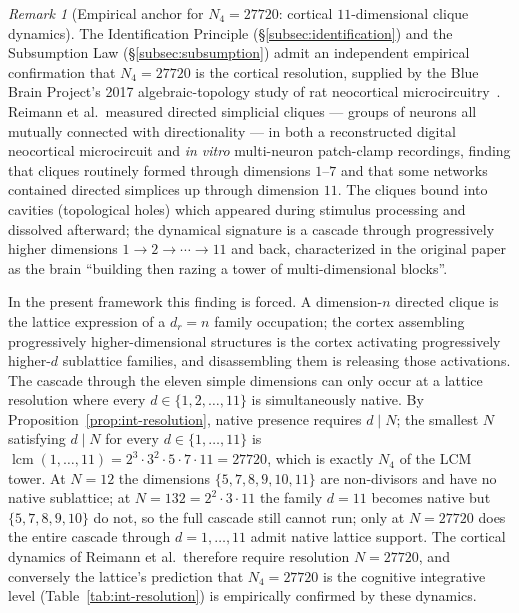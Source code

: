 \documentclass[11pt,a4paper]{article}
\theoremstyle{definition}
\theoremstyle{remark}
\newtheorem{remark}[theorem]{Remark}
\DeclareMathOperator{\lcm}{lcm}
\begin{document}
\begin{remark}[Empirical anchor for $N_{4}=27720$: cortical $11$-dimensional clique dynamics]\label{rem:cortex-27720}
The Identification Principle (\S\ref{subsec:identification}) and the Subsumption Law (\S\ref{subsec:subsumption}) admit an independent empirical confirmation that $N_{4}=27720$ is the cortical resolution, supplied by the Blue Brain Project's 2017 algebraic-topology study of rat neocortical microcircuitry~\cite{BlueBrain2017}. Reimann et al.\ measured directed simplicial cliques --- groups of neurons all mutually connected with directionality --- in both a reconstructed digital neocortical microcircuit and \emph{in vitro} multi-neuron patch-clamp recordings, finding that cliques routinely formed through dimensions $1$--$7$ and that some networks contained directed simplices up through dimension $11$. The cliques bound into cavities (topological holes) which appeared during stimulus processing and dissolved afterward; the dynamical signature is a cascade through progressively higher dimensions $1 \to 2 \to \cdots \to 11$ and back, characterized in the original paper as the brain ``building then razing a tower of multi-dimensional blocks''.

In the present framework this finding is forced. A dimension-$n$ directed clique is the lattice expression of a $d_{r}=n$ family occupation; the cortex assembling progressively higher-dimensional structures is the cortex activating progressively higher-$d$ sublattice families, and disassembling them is releasing those activations. The cascade through the eleven simple dimensions can only occur at a lattice resolution where every $d \in \{1,2,\ldots,11\}$ is simultaneously native. By Proposition~\ref{prop:int-resolution}, native presence requires $d \mid N$; the smallest $N$ satisfying $d \mid N$ for every $d \in \{1,\ldots,11\}$ is $\lcm(1,\ldots,11) = 2^{3}\cdot 3^{2}\cdot 5\cdot 7\cdot 11 = 27720$, which is exactly $N_{4}$ of the LCM tower. At $N=12$ the dimensions $\{5,7,8,9,10,11\}$ are non-divisors and have no native sublattice; at $N=132 = 2^{2}\cdot 3\cdot 11$ the family $d=11$ becomes native but $\{5,7,8,9,10\}$ do not, so the full cascade still cannot run; only at $N=27720$ does the entire cascade through $d=1,\ldots,11$ admit native lattice support. The cortical dynamics of Reimann et al.\ therefore require resolution $N=27720$, and conversely the lattice's prediction that $N_{4}=27720$ is the cognitive integrative level (Table~\ref{tab:int-resolution}) is empirically confirmed by these dynamics.


\end{remark}
\end{document}
